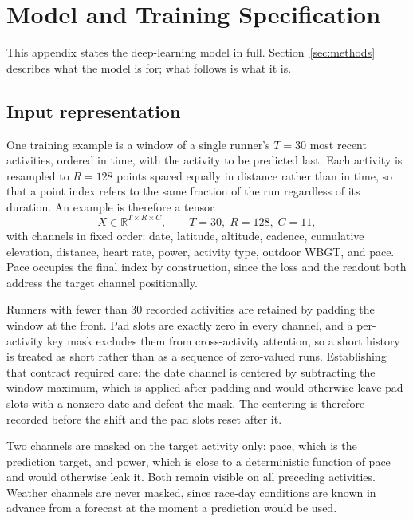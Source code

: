\section{Model and Training Specification}
\label{app:model}

This appendix states the deep-learning model in full. Section~\ref{sec:methods} describes what the
model is for; what follows is what it is.

\subsection{Input representation}

One training example is a window of a single runner's $T = 30$ most recent activities, ordered in
time, with the activity to be predicted last. Each activity is resampled to $R = 128$ points spaced
equally in distance rather than in time, so that a point index refers to the same fraction of the
run regardless of its duration. An example is therefore a tensor
\begin{equation}
  X \in \mathbb{R}^{T \times R \times C}, \qquad T = 30,\; R = 128,\; C = 11,
\end{equation}
with channels in fixed order: date, latitude, altitude, cadence, cumulative elevation, distance,
heart rate, power, activity type, outdoor WBGT, and pace. Pace occupies the final index by
construction, since the loss and the readout both address the target channel positionally.

Runners with fewer than 30 recorded activities are retained by padding the window at the front. Pad
slots are exactly zero in every channel, and a per-activity key mask excludes them from
cross-activity attention, so a short history is treated as short rather than as a sequence of
zero-valued runs. Establishing that contract required care: the date channel is centered by
subtracting the window maximum, which is applied after padding and would otherwise leave pad slots
with a nonzero date and defeat the mask. The centering is therefore recorded before the shift and
the pad slots reset after it.

Two channels are masked on the target activity only: pace, which is the prediction target, and
power, which is close to a deterministic function of pace and would otherwise leak it. Both remain
visible on all preceding activities. Weather channels are never masked, since race-day conditions
are known in advance from a forecast at the moment a prediction would be used.

